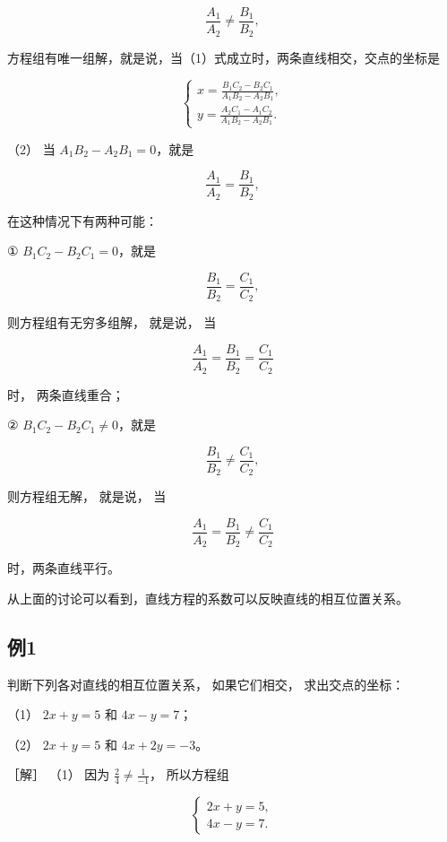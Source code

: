 \[
\frac {A_{1}}{A_{2}} \neq \frac {B_{1}}{B_{2}}, \tag {1}
\]

方程组有唯一组解，就是说，当（1）式成立时，两条直线相交，交点的坐标是

\[
\left\{ \begin{array}{l} x = \frac {B_{1} C_{2} - B_{2} C_{1}}{A_{1} B_{2} - A_{2} B_{1}}, \\ y = \frac {A_{2} C_{1} - A_{1} C_{2}}{A_{1} B_{2} - A_{2} B_{1}}. \end{array} \right.
\]

（2） 当 \(A_{1}B_{2} - A_{2}B_{1} = 0\)，就是

\[
\frac {A_{1}}{A_{2}} = \frac {B_{1}}{B_{2}},
\]

在这种情况下有两种可能：

① \(B_{1}C_{2} - B_{2}C_{1} = 0\)，就是

\[
\frac {B_{1}}{B_{2}} = \frac {C_{1}}{C_{2}},
\]

则方程组有无穷多组解， 就是说， 当

\[
\frac {A_{1}}{A_{2}} = \frac {B_{1}}{B_{2}} = \frac {C_{1}}{C_{2}}
\]

时， 两条直线重合；

② \(B_{1}C_{2} - B_{2}C_{1}\neq 0\)，就是

\[
\frac {B_{1}}{B_{2}} \neq \frac {C_{1}}{C_{2}},
\]

则方程组无解， 就是说， 当

\[
\frac {A_{1}}{A_{2}} = \frac {B_{1}}{B_{2}} \neq \frac {C_{1}}{C_{2}}
\]

时，两条直线平行。

从上面的讨论可以看到，直线方程的系数可以反映直线的相互位置关系。

\subsection{例1}\label{ux4f8b1-16}

判断下列各对直线的相互位置关系， 如果它们相交， 求出交点的坐标：

（1） \(2x + y = 5\) 和 \(4x - y = 7\)；

（2） \(2x + y = 5\) 和 \(4x + 2y = -3\)。

［解］ （1） 因为 \(\frac{2}{4} \neq \frac{1}{-1}\)， 所以方程组

\[
\left\{ \begin{array}{l} 2 x + y = 5, \\ 4 x - y = 7. \end{array} \right.
\]

